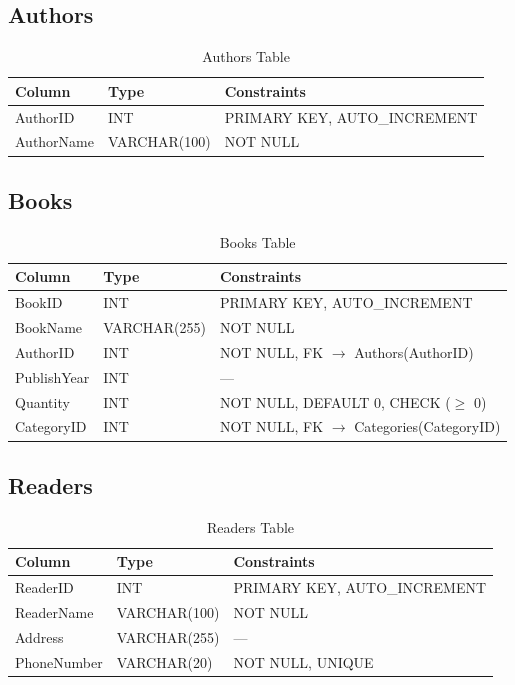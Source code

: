\documentclass[12pt,a4paper,oneside]{report}
\begin{document}
\subsection{Authors}
\begin{table}[H]
  \centering
  \caption{Authors Table}
  \begin{tabular}{L{3cm} L{3cm} L{6cm}}
    \toprule
    \textbf{Column} & \textbf{Type} & \textbf{Constraints} \\
    \midrule
    AuthorID   & INT          & PRIMARY KEY, AUTO\_INCREMENT \\
    AuthorName & VARCHAR(100) & NOT NULL \\
    \bottomrule
  \end{tabular}
\end{table}

\subsection{Books}
\begin{table}[H]
  \centering
  \caption{Books Table}
  \begin{tabular}{L{3cm} L{3cm} L{6cm}}
    \toprule
    \textbf{Column} & \textbf{Type} & \textbf{Constraints} \\
    \midrule
    BookID      & INT          & PRIMARY KEY, AUTO\_INCREMENT \\
    BookName    & VARCHAR(255) & NOT NULL \\
    AuthorID    & INT          & NOT NULL, FK $\rightarrow$ Authors(AuthorID) \\
    PublishYear & INT          & --- \\
    Quantity    & INT          & NOT NULL, DEFAULT 0, CHECK ($\geq$ 0) \\
    CategoryID  & INT          & NOT NULL, FK $\rightarrow$ Categories(CategoryID) \\
    \bottomrule
  \end{tabular}
\end{table}

\subsection{Readers}
\begin{table}[H]
  \centering
  \caption{Readers Table}
  \begin{tabular}{L{3cm} L{3cm} L{6cm}}
    \toprule
    \textbf{Column} & \textbf{Type} & \textbf{Constraints} \\
    \midrule
    ReaderID    & INT          & PRIMARY KEY, AUTO\_INCREMENT \\
    ReaderName  & VARCHAR(100) & NOT NULL \\
    Address     & VARCHAR(255) & --- \\
    PhoneNumber & VARCHAR(20)  & NOT NULL, UNIQUE \\
    \bottomrule
  \end{tabular}
\end{table}
\end{document}

